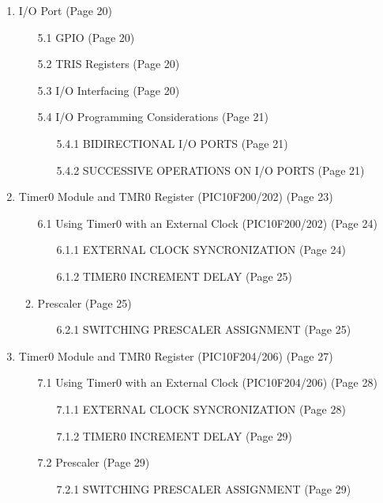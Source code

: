 \documentclass[12pt, letterpaper]{article}
\begin{document}
\begin{enumerate}
  \item I/O Port (Page 20)
  \begin{enumerate}
    \item [5.1] GPIO (Page 20)
    \item [5.2] TRIS Registers (Page 20)
    \item [5.3] I/O Interfacing (Page 20)
    \item [5.4] I/O Programming Considerations (Page 21)
    \begin{enumerate}
      \item [5.4.1] BIDIRECTIONAL I/O PORTS (Page 21)
      \item [5.4.2] SUCCESSIVE OPERATIONS ON I/O PORTS (Page 21)
    \end{enumerate}
  \end{enumerate}

  \item Timer0 Module and TMR0 Register (PIC10F200/202) (Page 23)
  \begin{enumerate}
    \item [6.1] Using Timer0 with an External Clock (PIC10F200/202) (Page 24)
    \begin{enumerate}
      \item [6.1.1] EXTERNAL CLOCK SYNCRONIZATION (Page 24)
      \item [6.1.2] TIMER0 INCREMENT DELAY (Page 25)
    \end{enumerate}
    \item Prescaler (Page 25)
    \begin{enumerate}
      \item [6.2.1] SWITCHING PRESCALER ASSIGNMENT (Page 25)
    \end{enumerate}
  \end{enumerate}

  \item Timer0 Module and TMR0 Register (PIC10F204/206) (Page 27)
  \begin{enumerate}
    \item [7.1] Using Timer0 with an External Clock (PIC10F204/206) (Page 28)
    \begin{enumerate}
      \item [7.1.1] EXTERNAL CLOCK SYNCRONIZATION (Page 28)
      \item [7.1.2] TIMER0 INCREMENT DELAY (Page 29)
    \end{enumerate}
    \item [7.2] Prescaler (Page 29)
    \begin{enumerate}
      \item [7.2.1] SWITCHING PRESCALER ASSIGNMENT (Page 29)
    \end{enumerate}
  \end{enumerate}


\end{enumerate}
\end{document}
